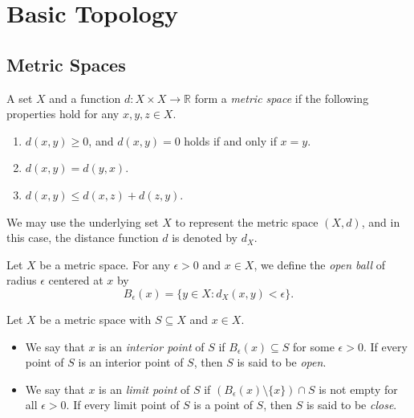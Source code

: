 \chapter{Basic Topology}
\section{Metric Spaces}
\begin{definition}
  A set $X$ and a function $d: X \times X \to \mathbb{R}$ form a \emph{metric
  space} if the following properties hold for any $x, y, z \in X$.
  \begin{enumerate}[1.]
    \item $d(x, y) \geq 0$, and $d(x, y) = 0$ holds if and only if $x = y$.
    \item $d(x, y) = d(y, x)$.
    \item $d(x, y) \leq d(x, z) + d(z, y)$.
  \end{enumerate}
\end{definition}
\begin{remark}
  We may use the underlying set $X$ to represent the metric space $(X, d)$,
  and in this case, the distance function $d$ is denoted by $d_X$.
\end{remark}

\begin{definition}
  Let $X$ be a metric space.
  For any $\epsilon > 0$ and $x \in X$, we define the \emph{open ball} of
  radius $\epsilon$ centered at $x$ by
  \begin{equation*}
    B_\epsilon(x) = \{y \in X: d_X(x, y) < \epsilon\}.
  \end{equation*}
\end{definition}

\begin{definition}
  Let $X$ be a metric space with $S \subseteq X$ and $x \in X$.
  \begin{itemize}
    \item We say that $x$ is an \emph{interior point} of $S$ if
    $B_\epsilon(x) \subseteq S$ for some $\epsilon > 0$.
    If every point of $S$ is an interior point of $S$, then $S$ is said to be
    \emph{open}.
    \item We say that $x$ is an \emph{limit point} of $S$ if
    $(B_\epsilon(x) \setminus \{x\}) \cap S$ is not empty for all
    $\epsilon > 0$.
    If every limit point of $S$ is a point of $S$, then $S$ is said to be
    \emph{close}.
  \end{itemize}
\end{definition}

